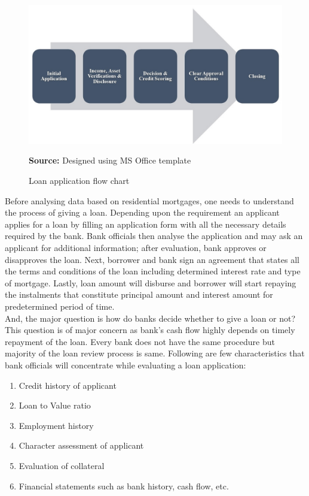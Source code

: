{\begin{figure}
\includegraphics[width=\textwidth]{Loanflowchart.jpg}
\centering
\caption{Loan application flow chart}{\textbf{Source:} Designed using MS Office template}
\label{fig:loanflowchart}
\end{figure}

Before analysing data based on residential mortgages, one needs to understand the process of giving a loan. Depending upon the requirement an applicant applies for a loan by filling an application form with all the necessary details required by the bank. Bank officials then analyse the application and may ask an applicant for additional information; after evaluation, bank approves or disapproves the loan. Next, borrower and bank sign an agreement that states all the terms and conditions of the loan including determined interest rate and type of mortgage. Lastly, loan amount will disburse and borrower will start repaying the instalments that constitute principal amount and interest amount for predetermined period of time.\\

And, the major question is how do banks decide whether to give a loan or not? This question is of major concern as bank's cash flow highly depends on timely repayment of the loan. Every bank does not have the same procedure but majority of the loan review process is same. Following are few characteristics that bank officials will concentrate while evaluating a loan application:
\begin{enumerate}
	\item Credit history of applicant
	\item Loan to Value ratio
	\item Employment history
	\item Character assessment of applicant
	\item Evaluation of collateral
	\item Financial statements such as bank history, cash flow, etc. 
\end{enumerate}

}
